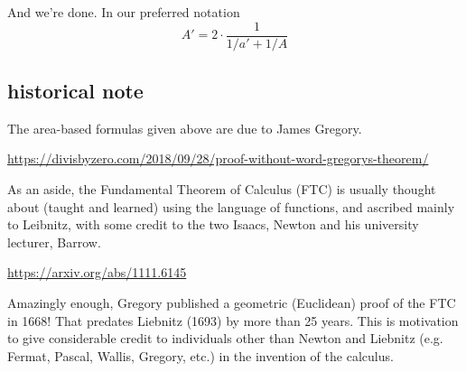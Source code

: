 \documentclass[11pt, oneside]{article}
\begin{document}
And we're done.  In our preferred notation
\[ A' = 2 \cdot \frac{1}{1/a' + 1/A} \]

\subsection*{historical note}

The area-based formulas given above are due to James Gregory.

\url{https://divisbyzero.com/2018/09/28/proof-without-word-gregorys-theorem/}

As an aside, the Fundamental Theorem of Calculus (FTC) is usually thought about (taught and learned) using the language of functions, and ascribed mainly to Leibnitz, with some credit to the two Isaacs, Newton and his university lecturer, Barrow.

\url{https://arxiv.org/abs/1111.6145}

Amazingly enough, Gregory published a geometric (Euclidean) proof of the FTC in 1668!  That predates Liebnitz (1693) by more than 25 years.  This is motivation to give considerable credit to individuals other than Newton and Liebnitz (e.g. Fermat, Pascal, Wallis, Gregory, etc.) in the invention of the calculus.
\end{document}
